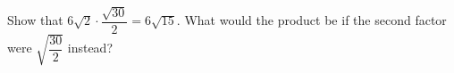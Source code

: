 Show that $6\sqrt2\cdot\dfrac{\sqrt{30}}{2}=6\sqrt{15}$. What would the product be if the second factor were $\sqrt{\dfrac{30}{2}}$ instead?
